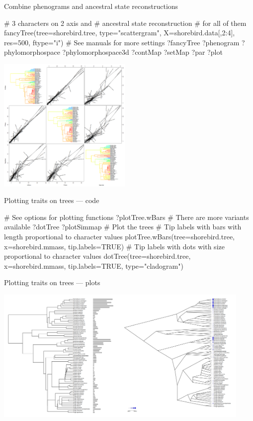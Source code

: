 \documentclass[compress, xelatex, 11pt, xcolor=svgnames, aspectratio=169,
	hyperref={
		bookmarks=true,
		unicode=true,
		colorlinks=true,
		pdftitle={Molecular data in R},
		plainpages=false,
		pdfauthor={Vojtech Zeisek},
		pdfsubject={Course about phylogeny and evolution in R},
		pdfcreator={XeLaTeX},
		pdfkeywords={R, evolution, phylogeny, molecular data},
		linkcolor=Crimson, %
		anchorcolor=Magenta, %
		citecolor=Magenta, %
		filecolor=Magenta, %
		menucolor=Magenta, %
		urlcolor=DodgerBlue, %
		},
	url={hyphens, lowtilde} %
	]{beamer}
\begin{document}
\begin{frame}[fragile]{Combine phenograms and ancestral state reconstructions}
	\begin{multicols}{2}
		\begin{spluscode}
    # 3 characters on 2 axis and
    # ancestral state reconstruction
    # for all of them
    fancyTree(tree=shorebird.tree,
      type="scattergram",
      X=shorebird.data[,2:4],
      res=500, ftype="i")
    # See manuals for more settings
    ?fancyTree
    ?phenogram
    ?phylomorphospace
    ?phylomorphospace3d
    ?contMap
    ?setMap
    ?par
    ?plot
		\end{spluscode}
		\begin{center}
			\includegraphics[height=6.5cm]{phenogram-ace.png}
		\end{center}
	\end{multicols}
\end{frame}

\begin{frame}[fragile]{Plotting traits on trees --- code}
	\begin{spluscode}
    # See options for plotting functions
    ?plotTree.wBars # There are more variants available
    ?dotTree
    ?plotSimmap
    # Plot the trees
    # Tip labels with bars with length proportional to character values
    plotTree.wBars(tree=shorebird.tree, x=shorebird.mmass, tip.labels=TRUE)
    # Tip labels with dots with size proportional to character values
    dotTree(tree=shorebird.tree, x=shorebird.mmass, tip.labels=TRUE,
      type="cladogram")
	\end{spluscode}
\end{frame}

\begin{frame}{Plotting traits on trees --- plots}
	\begin{center}
		\includegraphics[height=6.5cm]{treeval.png}
	\end{center}
\end{frame}
\end{document}
